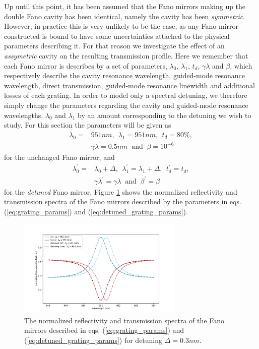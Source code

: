 Up until this point, it has been assumed that the Fano mirrors making up the double Fano cavity has been identical, namely the cavity has been \emph{symmetric}. However, in practice this is very unlikely to be the case, as any Fano mirror constructed is bound to have some uncertainties attached to the physical parameters describing it. For that reason we investigate the effect of an \emph{assymetric} cavity on the resulting transmission profile. Here we remember that each Fano mirror is describes by a set of parameters, $\lambda_0$, $\lambda_1$, $t_d$, $\gamma \lambda$ and $\beta$, which respectively describe the cavity resonance wavelength, guided-mode resonance wavelength, direct transmission, guided-mode resonance linewidth and additional losses of each grating. In order to model only a spectral detuning, we therefore simply change the parameters regarding the cavity and guided-mode resonance wavelengths, $\lambda_0$ and $\lambda_1$ by an amount corresponding to the detuning we wish to study. For this section the parameters will be given as
\begin{equation}
    \begin{split}
    \lambda_0 = &951 nm,\:\: \lambda_1 = 951 nm,\:\: t_d = 80\%,\\ &\gamma \lambda = 0.5 nm\: \text{ and }\: \beta = 10^{-6}
    \end{split}
    \label{eq:grating_params}
\end{equation}
for the unchanged Fano mirror, and
\begin{equation}
    \begin{split}
    \lambda_0^{\prime} = &\lambda_0 + \Delta,\:\: \lambda_1^{\prime} = \lambda_1 + \Delta,\:\: t_d^{\prime} = t_d,\\ &\gamma \lambda^{\prime} = \gamma \lambda\: \text{ and }\: \beta^{\prime} = \beta
    \end{split}
    \label{eq:detuned_grating_params}
\end{equation}
for the \emph{detuned} Fano mirror. Figure \ref{fig:detuned_grating_spectra} shows the normalized reflectivity and transmission spectra of the Fano mirrors described by the parameters in eqs. (\ref{eq:grating_params}) and (\ref{eq:detuned_grating_params}).

\begin{figure}[h!]
    \centering
    \includegraphics[width=0.7\textwidth]{figures/detuned_grating_spectra.pdf}
    \caption{The normalized reflectivity and transmission spectra of the Fano mirrors described in eqs. (\ref{eq:grating_params}) and (\ref{eq:detuned_grating_params}) for detuning $\Delta = 0.3nm$.}
    \label{fig:detuned_grating_spectra}
\end{figure}

